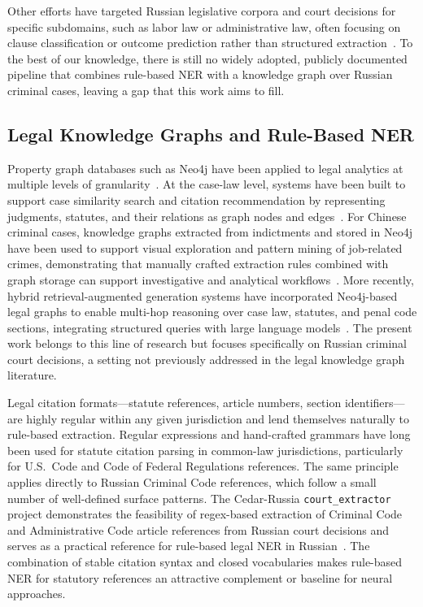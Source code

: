\documentclass[11pt]{article}
\begin{document}
Other efforts have targeted Russian legislative corpora and court decisions for specific subdomains, such as labor law or administrative law, often focusing on clause classification or outcome prediction rather than structured extraction~\cite{Metsker2019Procedia,Metsker2019Judgment,Melnikova2020Crime}. To the best of our knowledge, there is still no widely adopted, publicly documented pipeline that combines rule-based NER with a knowledge graph over Russian criminal cases, leaving a gap that this work aims to fill.

\subsection{Legal Knowledge Graphs and Rule-Based NER}

Property graph databases such as Neo4j have been applied to legal analytics at multiple levels of granularity~\cite{Shi2022JobCrimes,Morariu2023Embeddings,He2023Bridging}. At the case-law level, systems have been built to support case similarity search and citation recommendation by representing judgments, statutes, and their relations as graph nodes and edges~\cite{zhang2019chineselegalkg}. For Chinese criminal cases, knowledge graphs extracted from indictments and stored in Neo4j have been used to support visual exploration and pattern mining of job-related crimes, demonstrating that manually crafted extraction rules combined with graph storage can support investigative and analytical workflows~\cite{Shi2022JobCrimes}. More recently, hybrid retrieval-augmented generation systems have incorporated Neo4j-based legal graphs to enable multi-hop reasoning over case law, statutes, and penal code sections, integrating structured queries with large language models~\cite{He2023Bridging,Zhang2024Retrieval}. The present work belongs to this line of research but focuses specifically on Russian criminal court decisions, a setting not previously addressed in the legal knowledge graph literature.

Legal citation formats---statute references, article numbers, section identifiers---are highly regular within any given jurisdiction and lend themselves naturally to rule-based extraction.
Regular expressions and hand-crafted grammars have long been used for statute citation parsing in common-law jurisdictions, particularly for U.S.\ Code and Code of Federal Regulations references. The same principle applies directly to Russian Criminal Code references, which follow a small number of well-defined surface patterns. The Cedar-Russia \texttt{court\_extractor} project demonstrates the feasibility of regex-based extraction of Criminal Code and Administrative Code article references from Russian court decisions and serves as a practical reference for rule-based legal NER in Russian~\cite{cedar2020courtextractor}. The combination of stable citation syntax and closed vocabularies makes rule-based NER for statutory references an attractive complement or baseline for neural approaches.
\end{document}
